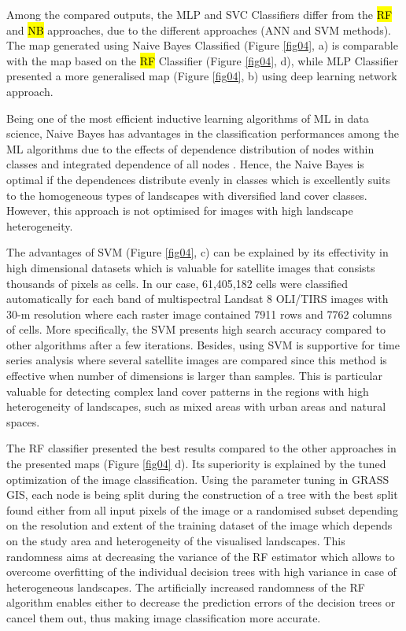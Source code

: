 \documentclass[final,5p,times,twocolumn]{elsarticle}
\numberwithin{table}{section}
\begin{document}
Among the compared outputs, the MLP and SVC Classifiers differ from the \hl{RF} and \hl{NB} approaches, due to the different approaches (ANN and SVM methods). The map generated using Naive Bayes Classified (Figure \ref{fig04}, a) is comparable with the map based on the \hl{RF} Classifier (Figure \ref{fig04}, d), while MLP Classifier presented a more generalised map (Figure \ref{fig04}, b) using deep learning network approach. 

Being one of the most efficient inductive learning algorithms of ML in data science, Naive Bayes has advantages in the classification performances among the ML algorithms due to the effects of dependence distribution of nodes within classes and integrated  dependence of all nodes \cite{Zhang2004TheOO}. Hence, the Naive Bayes is optimal if the dependences distribute evenly in classes which is excellently suits to the homogeneous types of landscapes with diversified land cover classes. However, this approach is not optimised for images with high landscape heterogeneity.

The advantages of SVM (Figure \ref{fig04}, c) can be explained by its effectivity in high dimensional datasets which is valuable for satellite images that consists thousands of pixels as cells. In our case, 61,405,182 cells were classified automatically for each band of multispectral Landsat 8 OLI/TIRS images with 30-m resolution where each raster image contained 7911 rows and 7762 columns of cells. More specifically, the SVM presents high search accuracy compared to other algorithms after a few iterations. Besides, using SVM is supportive for time series analysis where several satellite images are compared since this method is effective when number of dimensions is larger than samples. This is particular valuable for detecting complex land cover patterns in the regions with high heterogeneity of landscapes, such as mixed areas with urban areas and natural spaces. 

The RF classifier presented the best results compared to the other approaches in the presented maps (Figure \ref{fig04} d). Its superiority is explained by the tuned optimization of the image classification. Using the parameter tuning in GRASS GIS, each node is being split during the construction of a tree with the best split found either from all input pixels of the image or a randomised subset depending on the resolution and extent of the training dataset of the image which depends on the study area and heterogeneity of the visualised landscapes. This randomness aims at decreasing the variance of the RF estimator which allows to overcome overfitting of the individual decision trees with high variance in case of heterogeneous landscapes. The artificially increased randomness of the RF algorithm enables either to decrease the prediction errors of the decision trees or cancel them out, thus making image classification more accurate.
\end{document}
